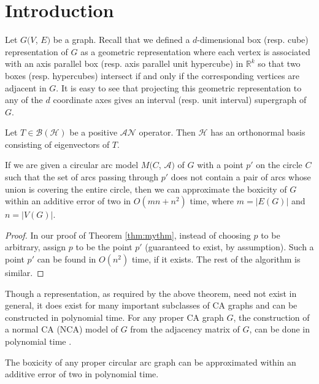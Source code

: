 \section{Introduction} \label{sec:intro}
Let $G(V$, $E)$ be a graph. Recall that we defined a $d$-dimensional box (resp. cube) representation of $G$ as a 
geometric representation where each vertex is associated with an axis parallel box (resp. axis parallel unit hypercube) in $\mathbb{R}^k$ so that 
two boxes (resp. hypercubes) intersect if and only if the corresponding vertices are adjacent in $G$. 
It is easy to see that projecting this geometric representation to any of the $d$ coordinate axes gives an interval (resp. unit interval) supergraph of $G$.
\begin{theorem}\label{thm:mythm}
Let $T \in \mathcal{B(H)}$ be a positive $\mathcal{AN}$ operator. Then $\mathcal{H}$ has an orthonormal basis consisting of eigenvectors of $T$.
\end{theorem}
\begin{theorem}
 If we are given a circular arc model $M(C$, $\mathcal{A})$ of $G$ with a point $p'$ on the circle $C$ such that the set of arcs passing through $p'$ does not contain a pair of arcs whose union is covering the entire circle, then we can approximate the boxicity of $G$ within an additive error of two in $O(mn+n^2)$ time, where $m=|E(G)|$ and $n=|V(G)|$.
\end{theorem}
\begin{proof}
  In our proof of Theorem \ref{thm:mythm}, instead of choosing $p$ to be arbitrary, assign $p$ to be the point $p'$ (guaranteed to exist, by assumption). Such a point $p'$ can be found in $O(n^2)$ time, if it exists. The rest of the algorithm is similar.
\end{proof}
  Though a representation, as required by the above theorem, need not exist in general, it does exist for many important subclasses of CA graphs and can be constructed in polynomial time. For any proper CA graph $G$, the construction of a normal CA (NCA) model of $G$ from the adjacency matrix of $G$, can be done in polynomial time \cite{Soulignac,Tucker2}. 
\begin{corollary}\label{corpca}
 The boxicity of any proper circular arc graph can be approximated within an additive error of two in polynomial time. 
\end{corollary}
